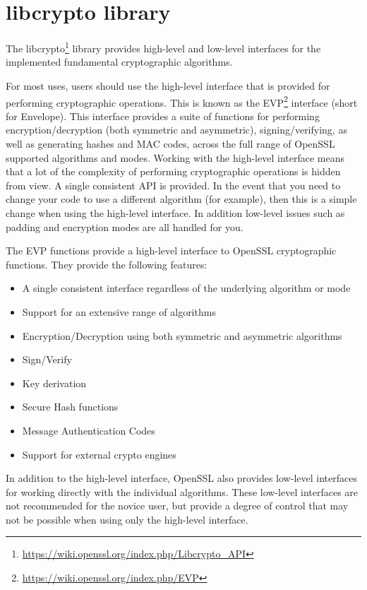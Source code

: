\section{libcrypto library}
\label{toc/openssl-libcrypto}

The libcrypto\footnote{\url{https://wiki.openssl.org/index.php/Libcrypto_API}} library provides high-level and low-level interfaces for the implemented fundamental cryptographic algorithms.

For most uses, users should use the high-level interface that is provided for performing cryptographic operations. This is known as the EVP\footnote{\url{https://wiki.openssl.org/index.php/EVP}} interface (short for Envelope). This interface provides a suite of functions for performing encryption/decryption (both symmetric and asymmetric), signing/verifying, as well as generating hashes and MAC codes, across the full range of OpenSSL supported algorithms and modes. Working with the high-level interface means that a lot of the complexity of performing cryptographic operations is hidden from view. A single consistent API is provided. In the event that you need to change your code to use a different algorithm (for example), then this is a simple change when using the high-level interface. In addition low-level issues such as padding and encryption modes are all handled for you.

The EVP functions provide a high-level interface to OpenSSL cryptographic functions. They provide the following features:

\begin{itemize}
  \item A single consistent interface regardless of the underlying algorithm or mode
  \item Support for an extensive range of algorithms
  \item Encryption/Decryption using both symmetric and asymmetric algorithms
  \item Sign/Verify
  \item Key derivation
  \item Secure Hash functions
  \item Message Authentication Codes
  \item Support for external crypto engines
\end{itemize}

In addition to the high-level interface, OpenSSL also provides low-level interfaces for working directly with the individual algorithms. These low-level interfaces are not recommended for the novice user, but provide a degree of control that may not be possible when using only the high-level interface.

